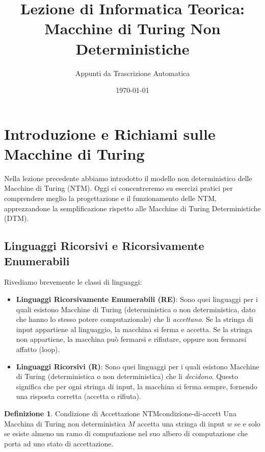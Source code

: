 \documentclass[a4paper]{article}
\title{Lezione di Informatica Teorica: Macchine di Turing Non Deterministiche}
\author{Appunti da Trascrizione Automatica}
\date{\today}
\theoremstyle{definition} %
\newtheorem{definition}{Definizione}[section]
\begin{document}

\maketitle
\tableofcontents
\newpage

\section{Introduzione e Richiami sulle Macchine di Turing}

Nella lezione precedente abbiamo introdotto il modello non deterministico delle Macchine di Turing (NTM). Oggi ci concentreremo su esercizi pratici per comprendere meglio la progettazione e il funzionamento delle NTM, apprezzandone la semplificazione rispetto alle Macchine di Turing Deterministiche (DTM).

\subsection{Linguaggi Ricorsivi e Ricorsivamente Enumerabili}

Rivediamo brevemente le classi di linguaggi:
\begin{itemize}
    \item \textbf{Linguaggi Ricorsivamente Enumerabili (RE)}: Sono quei linguaggi per i quali esistono Macchine di Turing (deterministica o non deterministica, dato che hanno lo stesso potere computazionale) che li \emph{accettano}. Se la stringa di input appartiene al linguaggio, la macchina si ferma e accetta. Se la stringa non appartiene, la macchina può fermarsi e rifiutare, oppure non fermarsi affatto (loop).
    \item \textbf{Linguaggi Ricorsivi (R)}: Sono quei linguaggi per i quali esistono Macchine di Turing (deterministica o non deterministica) che li \emph{decidono}. Questo significa che per ogni stringa di input, la macchina si ferma sempre, fornendo una risposta corretta (accetta o rifiuta).
\end{itemize}

\begin{definition}{Condizione di Accettazione NTM}{condizione-di-accett}
Una Macchina di Turing non deterministica $M$ accetta una stringa di input $w$ se e solo se esiste almeno un ramo di computazione nel suo albero di computazione che porta ad uno stato di accettazione.
\end{definition}
\end{document}
